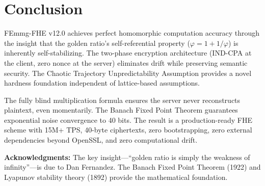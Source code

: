 \documentclass{article}
\begin{document}
\section{Conclusion}

FEmmg-FHE v12.0 achieves perfect homomorphic computation accuracy through the insight that the golden ratio's self-referential property ($\varphi = 1 + 1/\varphi$) is inherently self-stabilizing. The two-phase encryption architecture (IND-CPA at the client, zero nonce at the server) eliminates drift while preserving semantic security. The Chaotic Trajectory Unpredictability Assumption provides a novel hardness foundation independent of lattice-based assumptions.

The fully blind multiplication formula ensures the server never reconstructs plaintext, even momentarily. The Banach Fixed Point Theorem guarantees exponential noise convergence to 40 bits. The result is a production-ready FHE scheme with 15M+ TPS, 40-byte ciphertexts, zero bootstrapping, zero external dependencies beyond OpenSSL, and zero computational drift.

\textbf{Acknowledgments:} The key insight---``golden ratio is simply the weakness of infinity''---is due to Dan Fernandez. The Banach Fixed Point Theorem (1922) \cite{banach1922} and Lyapunov stability theory (1892) \cite{lyapunov1892} provide the mathematical foundation.
\end{document}
